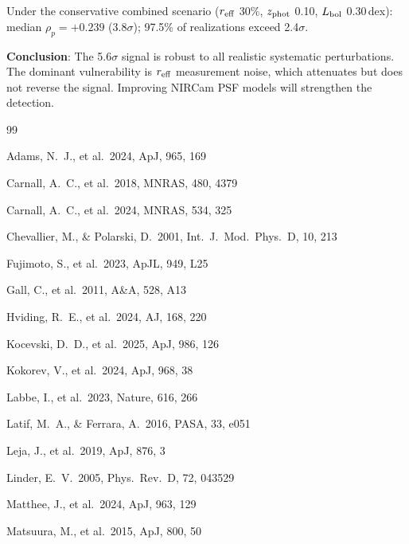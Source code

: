 \documentclass[apj,twocolumn,longbibliography,linenumbers]{aastex701}
\begin{document}
Under the conservative combined scenario ($r_{\rm eff}$ 30\%, $z_{\rm phot}$ 0.10, $L_{\rm bol}$ 0.30\,dex): median $\rho_p = +0.239$ (3.8$\sigma$); 97.5\% of realizations exceed 2.4$\sigma$.

\textbf{Conclusion}: The 5.6$\sigma$ signal is robust to all realistic systematic perturbations. The dominant vulnerability is $r_{\rm eff}$ measurement noise, which attenuates but does not reverse the signal. Improving NIRCam PSF models will strengthen the detection.



\begin{thebibliography}{99}

Adams, N.\ J., et al.\ 2024, ApJ, 965, 169

Carnall, A.\ C., et al.\ 2018, MNRAS, 480, 4379

Carnall, A.\ C., et al.\ 2024, MNRAS, 534, 325

Chevallier, M., \& Polarski, D.\ 2001, Int.\ J.\ Mod.\ Phys.\ D, 10, 213

Fujimoto, S., et al.\ 2023, ApJL, 949, L25

Gall, C., et al.\ 2011, A\&A, 528, A13

Hviding, R.\ E., et al.\ 2024, AJ, 168, 220

Kocevski, D.\ D., et al.\ 2025, ApJ, 986, 126

Kokorev, V., et al.\ 2024, ApJ, 968, 38

Labbe, I., et al.\ 2023, Nature, 616, 266

Latif, M.\ A., \& Ferrara, A.\ 2016, PASA, 33, e051

Leja, J., et al.\ 2019, ApJ, 876, 3

Linder, E.\ V.\ 2005, Phys.\ Rev.\ D, 72, 043529

Matthee, J., et al.\ 2024, ApJ, 963, 129

Matsuura, M., et al.\ 2015, ApJ, 800, 50


\end{thebibliography}
\end{document}
